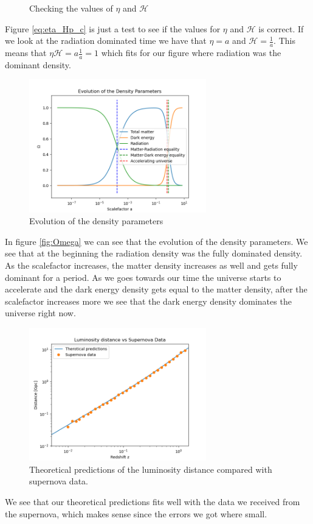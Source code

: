\documentclass{article}
\begin{document}
\begin{multicols}{2}
\begin{figure}[H]
	\caption{Checking the values of $\eta$ and $\mathcal{H}$}
	\label{eq:eta_Hp_c}
\end{figure}
Figure \eqref{eq:eta_Hp_c} is just a test to see if the values for $\eta$ and $\mathcal{H}$ is correct. If we look at the radiation dominated time we have that $\eta=a$ and $\mathcal{H}=\frac{1}{a}$. This means that $\eta\mathcal{H}=a\frac{1}{a}=1$ which fits for our figure where radiation was the dominant density. 
\begin{figure}[H]
	\centering
	\includegraphics[width=77mm]{Omega.png}
	\caption{Evolution of the density parameters}
	\label{fig:Omega}
\end{figure}
In figure \eqref{fig:Omega} we can see that the evolution of the density parameters. We see that at the beginning the radiation density was the fully dominated density. As the scalefactor increases, the matter density increases as well and gets fully dominant for a period. As we goes towards our time the universe starts to accelerate and the dark energy density gets equal to the matter density, after the scalefactor increases more we see that the dark energy density dominates the universe right now. \\
\begin{figure}[H]
	\centering
	\includegraphics[width=77mm]{LD_vs_SN.png}
	\caption{Theoretical predictions of the luminosity distance compared with supernova data.}
	\label{fig:LD_vs_SN}
\end{figure}
We see that our theoretical predictions fits well with the data we received from the supernova, which makes sense since the errors we got where small.
\end{multicols}
\clearpage
\appendix %
\end{document}
